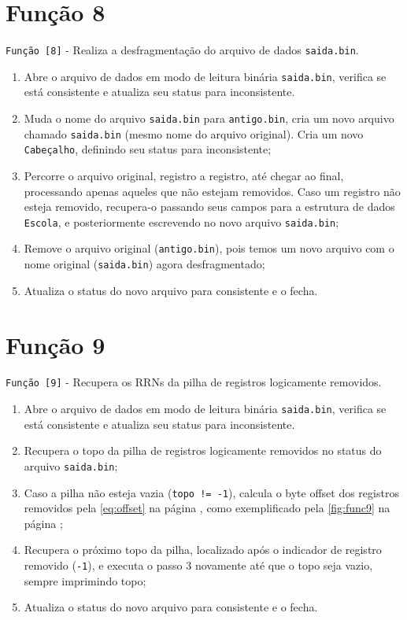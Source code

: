 \documentclass[
	12pt,				%
	openany,			%
	twoside,			%
	a4paper,			%
	english,			%
	french,				%
	spanish,			%
	brazil,				%
]{abntex2}
\begin{document}
	\section{Função 8}

		\verb|Função [8]| - Realiza a desfragmentação do arquivo de dados \verb|saida.bin|.

		\begin{enumerate}
			\item Abre o arquivo de dados em modo de leitura binária \verb|saida.bin|, verifica se está consistente e atualiza seu status para inconsistente.
			\item Muda o nome do arquivo \verb|saida.bin| para \verb|antigo.bin|, cria um novo arquivo chamado \verb|saida.bin| (mesmo nome do arquivo original). Cria um novo \verb|Cabeçalho|, definindo seu status para inconsistente;
			\item Percorre o arquivo original, registro a registro, até chegar ao final, processando apenas aqueles que não estejam removidos. Caso um registro não esteja removido, recupera-o passando seus campos para a estrutura de dados \verb|Escola|, e posteriormente escrevendo no novo arquivo \verb|saida.bin|;
			\item Remove o arquivo original (\verb|antigo.bin|), pois temos um novo arquivo com o nome original (\verb|saida.bin|) agora desfragmentado;
			\item Atualiza o status do novo arquivo para consistente e o fecha.
		\end{enumerate}

	\section{Função 9}

		\verb|Função [9]| - Recupera os RRNs da pilha de registros logicamente removidos.

		\begin{enumerate}
			\item Abre o arquivo de dados em modo de leitura binária \verb|saida.bin|, verifica se está consistente e atualiza seu status para inconsistente.
			\item Recupera o topo da pilha de registros logicamente removidos no status do arquivo \verb|saida.bin|;
			\item Caso a pilha não esteja vazia (\verb|topo != -1|), calcula o byte offset dos registros removidos pela \autoref{eq:offset} na página \pageref{eq:offset}, como exemplificado pela \autoref{fig:func9} na página \pageref{fig:func9};
			\item Recupera o próximo topo da pilha, localizado após o indicador de registro removido (\verb|-1|), e executa o passo 3 novamente até que o topo seja vazio, sempre imprimindo topo;
			\item Atualiza o status do novo arquivo para consistente e o fecha.
		\end{enumerate}
\end{document}
